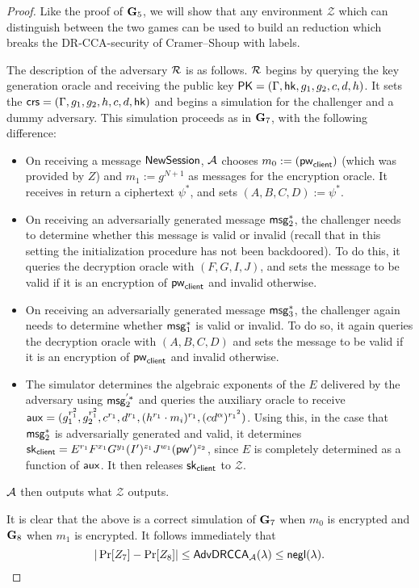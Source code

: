 \begin{proof}
	Like the proof of $\mathbf{G}_5$, we will show that any environment $\mathcal{Z}$ which can distinguish between the two games can be used to build an reduction which breaks the DR-CCA-security of Cramer--Shoup with labels.
	
	The description of the adversary $\mathcal{R}$ is as follows. $\mathcal{R}$ begins by querying the key generation oracle and receiving the public key $\mathsf{PK} = (\Gamma,\mathsf{hk},g_1,g_2,c,d,h)$. It sets the $\mathsf{crs} = (\Gamma,g_1,g_2,h,c,d,\mathsf{hk})$ and begins a simulation for the challenger and a dummy adversary. This simulation proceeds as in $\mathbf{G}_7$, with the following difference:
	
	\begin{itemize}
		\item On receiving a message $\mathsf{NewSession}$, $\mathcal{A}$ chooses $m_0:=(\mathsf{pw}_{\mathsf{client}})$ (which was provided by $Z$) and $m_1:=g^{N+1}$ as messages for the encryption oracle. It receives in return a ciphertext $\psi^{*}$, and sets $(A,B,C,D):=\psi^{*}$.
		\item On receiving an adversarially generated message $\mathsf{msg}_{2}^{*}$, the challenger needs to determine whether this message is valid or invalid (recall that in this setting the initialization procedure has not been backdoored). To do this, it queries the decryption oracle with $(F,G,I,J)$, and sets the message to be valid if it is an encryption of $\mathsf{pw}_{\mathsf{client}}$ and invalid otherwise.
		\item On receiving an adversarially generated message $\mathsf{msg}_{3}^{*}$, the challenger again needs to determine whether $\mathsf{msg}_{1}^{*}$ is valid or invalid. To do so, it again queries the decryption oracle with $(A,B,C,D)$ and sets the message to be valid if it is an encryption of $\mathsf{pw}_{\mathsf{client}}$ and invalid otherwise.
		\item The simulator determines the algebraic exponents of the $E$ delivered by the adversary using $\mathsf{msg}_{2}^{'*}$ and queries the auxiliary oracle to receive $\mathsf{aux} = (g_1^{r_1^2}, g_2^{r_1^2}, c^{r_1}, d^{r_1},(h^{r_1}\cdot m_i)^{r_1},(cd^{\alpha})^{{r_1}^2})$. Using this, in the case that $\mathsf{msg}_{2}^{*}$ is adversarially generated and valid, it determines $\mathsf{sk}_{\mathsf{client}} = E^{r_1}F^{x_1}G^{y_1}(I')^{z_1}J^{w_1}(\mathsf{pw}')^{z_2}$, since $E$ is completely determined as a function of $\mathsf{aux}$. It then releases $\mathsf{sk}_{\mathsf{client}}$ to $\mathcal{Z}$.
	\end{itemize}

	$\mathcal{A}$ then outputs what $\mathcal{Z}$ outputs.
	
	It is clear that the above is a correct simulation of $\mathbf{G}_7$ when $m_0$ is encrypted and $\mathbf{G}_8$ when $m_1$ is encrypted. It follows immediately that $$|\Pr[Z_7]-\Pr[Z_8]|\leq\mathsf{AdvDRCCA}_{\mathcal{A}}(\lambda)\leq\mathsf{negl}(\lambda).$$
\end{proof}

